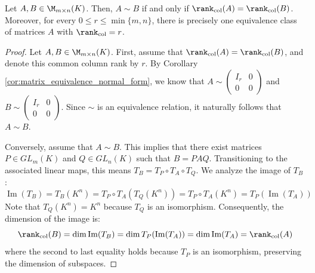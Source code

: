 \begin{corollary}
\label{cor:matrix_rank_equivalence_classification}
Let $A, B \in \M_{m \times n}(K)$. Then, $A \sim B$ if and only if $\rank_{\text{col}}(A) = \rank_{\text{col}}(B)$. Moreover, for every $0 \le r \le \min\{m, n\}$, there is precisely one equivalence class of matrices $A$ with $\rank_{\text{col}} = r$.
\end{corollary}

\begin{proof}
Let $A, B \in \M_{m \times n}(K)$. First, assume that $\rank_{\text{col}}(A) = \rank_{\text{col}}(B)$, and denote this common column rank by $r$. By Corollary \ref{cor:matrix_equivalence_normal_form}, we know that $A \sim \begin{pmatrix} I_r & 0 \\ 0 & 0 \end{pmatrix}$ and $B \sim \begin{pmatrix} I_r & 0 \\ 0 & 0 \end{pmatrix}$. Since $\sim$ is an equivalence relation, it naturally follows that $A \sim B$.

Conversely, assume that $A \sim B$. This implies that there exist matrices $P \in GL_m(K)$ and $Q \in GL_n(K)$ such that $B = PAQ$. Transitioning to the associated linear maps, this means $T_B = T_P \circ T_A \circ T_Q$. We analyze the image of $T_B$:
\begin{equation*}
    \operatorname{Im}(T_B) = T_B(K^n) = T_P \circ T_A(T_Q(K^n)) = T_P \circ T_A(K^n) = T_P(\operatorname{Im}(T_A))
\end{equation*}
Note that $T_Q(K^n) = K^n$ because $T_Q$ is an isomorphism. Consequently, the dimension of the image is:
\begin{equation*}
    \rank_{\text{col}}(B) = \dim \operatorname{Im}(T_B) = \dim T_P(\operatorname{Im}(T_A)) = \dim \operatorname{Im}(T_A) = \rank_{\text{col}}(A)
\end{equation*}
where the second to last equality holds because $T_P$ is an isomorphism, preserving the dimension of subspaces.
\end{proof}